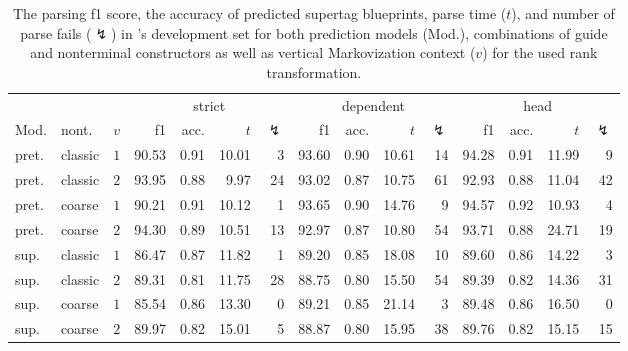 \documentclass[../../document.tex]{subfiles}
\begin{document}
    \begin{table}
        \caption{\label{tbl:experiments:dptb}
        The parsing f1 score, the accuracy of predicted supertag blueprints, parse time ($t$), and number of parse fails ($\lightning$) in 's development set for both prediction models (Mod.), combinations of guide and nonterminal constructors as well as vertical Markovization context ($v$) for the used rank transformation.
        }
        \centering
        \setlength{\tabcolsep}{4pt}
        \vspace{.2cm}
        \begin{tabular}{llc|rrrr|rrrr|rrrr}
            \toprule
  &             &        & \multicolumn{4}{c|}{strict} & \multicolumn{4}{c|}{dependent} & \multicolumn{4}{c}{head}  \\
Mod. &     nont.   &\(v\)   & f1 & acc. & $t$ & $\lightning$ & f1 & acc. & $t$ & $\lightning$ & f1 & acc. & $t$ & $\lightning$ \\ \hline
pret. &     classic & \(1\)  & 90.53 & 0.91 & 10.01 & 3 & 93.60 & 0.90 & 10.61 & 14 & 94.28 & 0.91 & 11.99 & 9 \\
pret. &     classic & \(2\)  & 93.95 & 0.88 & 9.97 & 24 & 93.02 & 0.87 & 10.75 & 61 & 92.93 & 0.88 & 11.04 & 42 \\
pret. &     coarse  & \(1\)  & 90.21 & 0.91 & 10.12 & 1 & 93.65 & 0.90 & 14.76 & 9 & 94.57 & 0.92 & 10.93 & 4 \\
pret. &     coarse  & \(2\)  & 94.30 & 0.89 & 10.51 & 13 & 92.97 & 0.87 & 10.80 & 54 & 93.71 & 0.88 & 24.71 & 19 \\
\midrule
sup. & classic & \(1\)  & 86.47 & 0.87 & 11.82 & 1 & 89.20 & 0.85 & 18.08 & 10 & 89.60 & 0.86 & 14.22 & 3 \\
sup. & classic & \(2\)  & 89.31 & 0.81 & 11.75 & 28 & 88.75 & 0.80 & 15.50 & 54 & 89.39 & 0.82 & 14.36 & 31 \\
sup. & coarse  & \(1\)  & 85.54 & 0.86 & 13.30 & 0 & 89.21 & 0.85 & 21.14 & 3 & 89.48 & 0.86 & 16.50 & 0 \\
sup. & coarse  & \(2\)  & 89.97 & 0.82 & 15.01 & 5 & 88.87 & 0.80 & 15.95 & 38 & 89.76 & 0.82 & 15.15 & 15 \\
    \bottomrule
        \end{tabular}
    \end{table}
\end{document}
